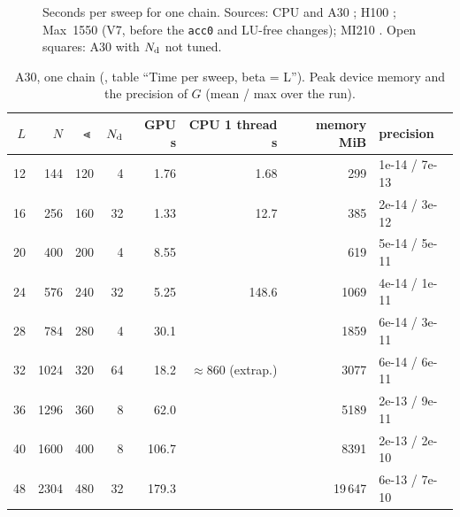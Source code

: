 \begin{figure}[h]
\centering
{}
\caption{Seconds per sweep for one chain. Sources: CPU and A30 ; H100 ; Max~1550  (V7, before the \texttt{acc0} and LU-free changes); MI210 . Open squares: A30 with $N_{\rm d}$ not tuned.}
\label{fig:sweepL}
\end{figure}

\begin{table}[h]
\centering\small
\caption{A30, one chain (, table ``Time per sweep, beta = L''). Peak device memory and the precision of $G$ (mean / max over the run).}
\label{tab:a30all}
\begin{tabular}{@{}rrrrrrrl@{}}
\toprule
$L$ & $N$ & $\Lt$ & $N_{\rm d}$ & GPU s & CPU 1 thread s & memory MiB & precision \\
\midrule
12 & 144 & 120 & 4 & 1.76 & 1.68 & 299 & 1e-14 / 7e-13 \\ %
16 & 256 & 160 & 32 & 1.33 & 12.7 & 385 & 2e-14 / 3e-12 \\
20 & 400 & 200 & 4 & 8.55 & & 619 & 5e-14 / 5e-11 \\
24 & 576 & 240 & 32 & 5.25 & 148.6 & 1069 & 4e-14 / 1e-11 \\
28 & 784 & 280 & 4 & 30.1 & & 1859 & 6e-14 / 3e-11 \\
32 & 1024 & 320 & 64 & 18.2 & $\approx$860 (extrap.) & 3077 & 6e-14 / 6e-11 \\
36 & 1296 & 360 & 8 & 62.0 & & 5189 & 2e-13 / 9e-11 \\
40 & 1600 & 400 & 8 & 106.7 & & 8391 & 2e-13 / 2e-10 \\
48 & 2304 & 480 & 32 & 179.3 & & 19\,647 & 6e-13 / 7e-10 \\
\bottomrule
\end{tabular}
\end{table}

